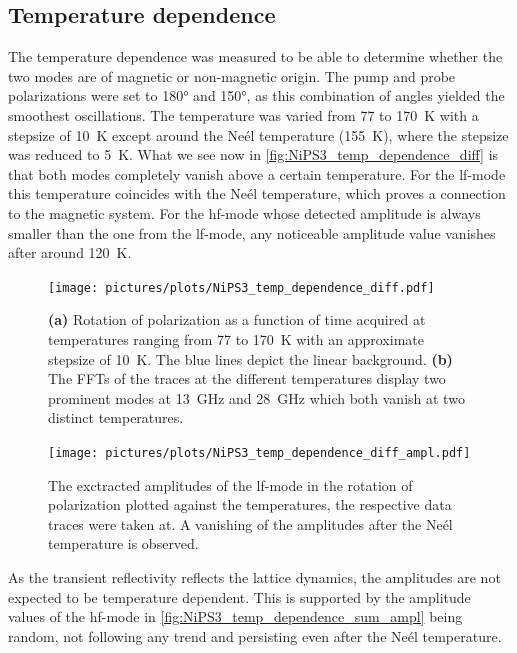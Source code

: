 \subsection{Temperature dependence}
The temperature dependence was measured to be able to determine whether the two modes are of magnetic or non-magnetic origin.
The pump and probe polarizations were set to 180° and 150°, as this combination of angles yielded the smoothest oscillations.
The temperature was varied from 77 to \qty{170}{K} with a stepsize of \qty{10}{K} except around the Neél temperature (\qty{155}{K}), where the stepsize was reduced to \qty{5}{K}.
What we see now in \autoref{fig:NiPS3_temp_dependence_diff} is that both modes completely vanish above a certain temperature.
For the lf-mode this temperature coincides with the Neél temperature, which proves a connection to the magnetic system.
For the hf-mode whose detected amplitude is always smaller than the one from the lf-mode, any noticeable amplitude value vanishes after around \qty{120}{K}.
\begin{figure}[hbt!]
    \centering
    \texttt{[image: pictures/plots/NiPS3\_temp\_dependence\_diff.pdf]} \vspace{-0.3cm}
    \caption{\textbf{(a)} Rotation of polarization as a function of time acquired at temperatures ranging from 77 to \qty{170}{K} with an approximate stepsize of \qty{10}{K}. The blue lines depict the linear background. \textbf{(b)} The FFTs of the traces at the different temperatures display two prominent modes at \qty{13}{GHz} and \qty{28}{GHz} which both vanish at two distinct temperatures.}
    \label{fig:NiPS3_temp_dependence_diff}
\end{figure}
\begin{figure}[hbt!]
    \centering  
    \texttt{[image: pictures/plots/NiPS3\_temp\_dependence\_diff\_ampl.pdf]} \vspace{-0.3cm}
    \caption{The exctracted amplitudes of the lf-mode in the rotation of polarization plotted against the temperatures, the respective data traces were taken at. A vanishing of the amplitudes after the Neél temperature is observed.}
    \label{fig:NiPS3_temp_dependence_diff_ampl}
\end{figure}
\FloatBarrier
As the transient reflectivity reflects the lattice dynamics, the amplitudes are not expected to be temperature dependent.
This is supported by the amplitude values of the hf-mode in \autoref{fig:NiPS3_temp_dependence_sum_ampl} being random, not following any trend and persisting even after the Neél temperature.
